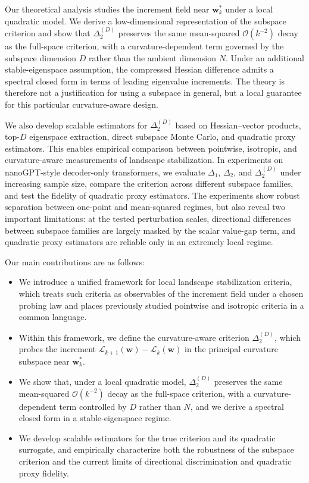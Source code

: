 \documentclass[10pt]{article}
\theoremstyle{plain}
\theoremstyle{remark}
\begin{document}
Our theoretical analysis studies the increment field near $\mathbf w_k^*$ under a local quadratic model.
We derive a low-dimensional representation of the subspace criterion and show that $\Delta_2^{(D)}$ preserves the same mean-squared $\mathcal O(k^{-2})$ decay as the full-space criterion, with a curvature-dependent term governed by the subspace dimension $D$ rather than the ambient dimension $N$.
Under an additional stable-eigenspace assumption, the compressed Hessian difference admits a spectral closed form in terms of leading eigenvalue increments.
The theory is therefore not a justification for using a subspace in general, but a local guarantee for this particular curvature-aware design.

We also develop scalable estimators for $\Delta_2^{(D)}$ based on Hessian--vector products, top-$D$ eigenspace extraction, direct subspace Monte Carlo, and quadratic proxy estimators.
This enables empirical comparison between pointwise, isotropic, and curvature-aware measurements of landscape stabilization.
In experiments on nanoGPT-style decoder-only transformers, we evaluate $\Delta_1$, $\Delta_2$, and $\Delta_2^{(D)}$ under increasing sample size, compare the criterion across different subspace families, and test the fidelity of quadratic proxy estimators.
The experiments show robust separation between one-point and mean-squared regimes, but also reveal two important limitations: at the tested perturbation scales, directional differences between subspace families are largely masked by the scalar value-gap term, and quadratic proxy estimators are reliable only in an extremely local regime.

Our main contributions are as follows:
\begin{itemize}
    \item We introduce a unified framework for local landscape stabilization criteria, which treats such criteria as observables of the increment field under a chosen probing law and places previously studied pointwise and isotropic criteria in a common language.
    \item Within this framework, we define the curvature-aware criterion $\Delta_2^{(D)}$, which probes the increment $\mathcal L_{k+1}(\mathbf{w}) - \mathcal L_k(\mathbf{w})$ in the principal curvature subspace near $\mathbf w_k^*$.
    \item We show that, under a local quadratic model, $\Delta_2^{(D)}$ preserves the same mean-squared $\mathcal O(k^{-2})$ decay as the full-space criterion, with a curvature-dependent term controlled by $D$ rather than $N$, and we derive a spectral closed form in a stable-eigenspace regime.
    \item We develop scalable estimators for the true criterion and its quadratic surrogate, and empirically characterize both the robustness of the subspace criterion and the current limits of directional discrimination and quadratic proxy fidelity.
\end{itemize}
\end{document}
